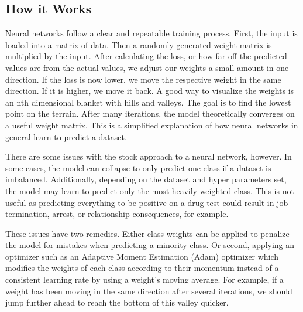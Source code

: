 \documentclass[journal]{IEEEtran}
\begin{document}
\subsection{How it Works} 
\par Neural networks follow a clear and repeatable training process. First, the input is loaded into a matrix of data. Then a randomly generated weight matrix is multiplied by the input. After calculating the loss, or how far off the predicted values are from the actual values, we adjust our weights a small amount in one direction. If the loss is now lower, we move the respective weight in the same direction. If it is higher, we move it back. A good way to visualize the weights is an nth dimensional blanket with hills and valleys. The goal is to find the lowest point on the terrain. After many iterations, the model theoretically converges on a useful weight matrix. This is a simplified explanation of how neural networks in general learn to predict a dataset.
\par There are some issues with the stock approach to a neural network, however. In some cases, the model can collapse to only predict one class if a dataset is imbalanced. Additionally, depending on the dataset and hyper parameters set, the model may learn to predict only the most heavily weighted class. This is not useful as predicting everything to be positive on a drug test could result in job termination, arrest, or relationship consequences, for example. 
\par These issues have two remedies. Either class weights can be applied to penalize the model for mistakes when predicting a minority class. Or second, applying an optimizer such as an Adaptive Moment Estimation (Adam) optimizer which modifies the weights of each class according to their momentum instead of a consistent learning rate by using a weight's moving average. For example, if a weight has been moving in the same direction after several iterations, we should jump further ahead to reach the bottom of this valley quicker.  
\end{document}
